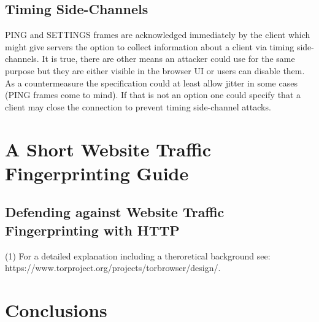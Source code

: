 \documentclass[letterpaper,11pt]{llncs}
\begin{document}
\subsection{Timing Side-Channels}

PING and SETTINGS frames are acknowledged immediately by the client which might
give servers the option to collect information about a client via timing
side-channels. It is true, there are other means an attacker could use for the
same purpose but they are either visible in the browser UI or users can disable
them. As a countermeasure the specification could at least allow jitter in some
cases (PING frames come to mind). If that is not an option one could specify
that a client may close the connection to prevent timing side-channel attacks.


\section{A Short Website Traffic Fingerprinting Guide}


\subsection{Defending against Website Traffic Fingerprinting with HTTP}

(1) For a detailed explanation including a theroretical background see:
https://www.torproject.org/projects/torbrowser/design/.

\section{Conclusions}


 

\clearpage
\appendix
\end{document}
